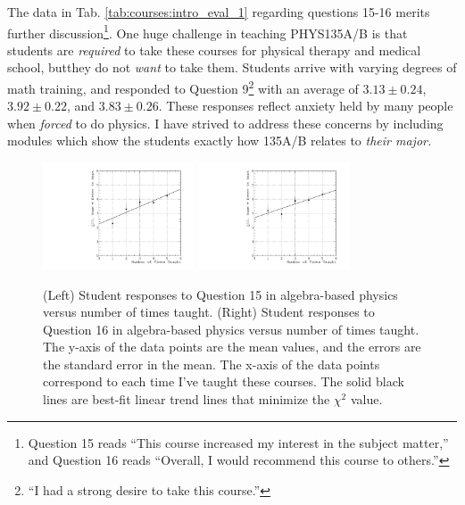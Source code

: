 \documentclass[../../main.tex]{subfiles}
\begin{document}
The data in Tab. \ref{tab:courses:intro_eval_1} regarding questions 15-16 merits further discussion\footnote{Question 15 reads ``This course increased my interest in the subject matter,'' and Question 16 reads ``Overall, I would recommend this course to others.''}.  One huge challenge in teaching PHYS135A/B is that students are \textit{required} to take these courses for physical therapy and medical school, butthey  do not \textit{want} to take them.  Students arrive with varying degrees of math training, and responded to Question 9\footnote{``I had a strong desire to take this course.''} with an average of $3.13 \pm 0.24$, $3.92 \pm 0.22$, and $3.83 \pm 0.26$.  These responses reflect anxiety held by many people when \textit{forced} to do physics.  I have strived to address these concerns by including modules which show the students exactly how 135A/B relates to \textit{their major.} \\ \hspace{0.1cm}

\begin{figure}[h]
\centering
\includegraphics[width=0.4\textwidth]{Q15_algebra_based.pdf}
\includegraphics[width=0.4\textwidth]{Q16_algebra_based.pdf}
\caption{\label{fig:courses:intro_q15}  (Left) Student responses to Question 15 in algebra-based physics versus number of times taught. (Right) Student responses to Question 16 in algebra-based physics versus number of times taught.  The y-axis of the data points are the mean values, and the errors are the standard error in the mean.  The x-axis of the data points correspond to each time I've taught these courses.  The solid black lines are best-fit linear trend lines that minimize the $\chi^2$ value.}
\end{figure}
\end{document}
